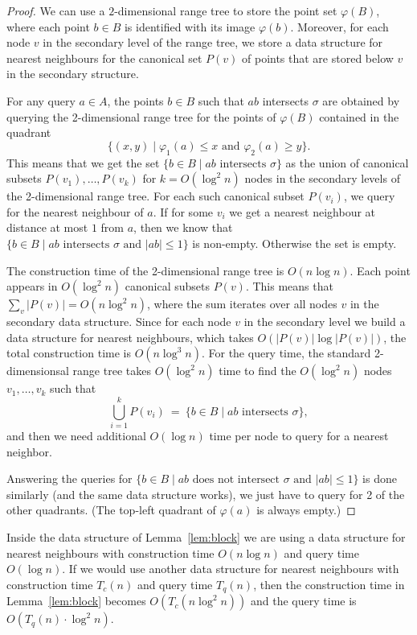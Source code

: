 \documentclass[a4paper,11pt]{article}
\let\le\leqslant
\let\ge\geqslant
\begin{document}
\begin{proof}
	We can use a $2$-dimensional range tree to store the point set $\varphi(B)$,
	where each point $b\in B$ is identified with its image $\varphi(b)$. 
	Moreover, for each node $v$ in the secondary level of the range tree, we 
	store a data structure for nearest neighbours for the canonical set $P(v)$ of points
	that are stored below $v$ in the secondary structure.
	
	For any query $a\in A$, the points $b\in B$ such that $ab$ intersects
	$\sigma$ are obtained by querying the 2-dimensional range tree for the points
	of $\varphi(B)$ contained in the quadrant 
	\[
		\{(x,y)\mid  \varphi_1(a) \le x \text{ and } \varphi_2(a) \ge y\}.
	\]
	This means that we get the set
	$\{ b\in B \mid \text{$ab$ intersects $\sigma$}\}$
	as the union of canonical subsets 
	$P(v_1),\dots,P(v_k)$ for $k=O(\log^2 n)$ nodes in the secondary levels
	of the 2-dimensional range tree.
	For each such canonical subset $P(v_i)$, we query for the nearest neighbour of $a$.
	If for some $v_i$ we get a nearest neighbour at distance at most $1$ from $a$,
	then we know that $\{ b\in B \mid \text{$ab$ intersects $\sigma$ and $|ab|\le 1$}\}$
	is non-empty. Otherwise the set is empty.

	The construction time of the 2-dimensional range tree is $O(n\log n)$.
	Each point appears in $O(\log^2 n)$ canonical subsets $P(v)$.
	This means that $\sum_v |P(v)| = O( n\log^2 n)$, where the sum iterates over
	all nodes $v$ in the secondary data structure.
	Since for each node $v$ in the secondary level we build a data structure for
	nearest neighbours, which takes $O(|P(v)| \log |P(v)|)$,
	the total construction time is $O( n\log^3 n)$.
	For the query time, the standard 2-dimensionsal range tree takes
	$O(\log^2 n)$ time to find the $O(\log^2 n)$  nodes $v_1,\dots, v_k$ such
	that 
	\[
		\bigcup_{i=1}^k P(v_i) ~=~ \{ b\in B \mid \text{$ab$ intersects $\sigma$}\},
	\]
	and then we need additional $O(\log n)$ time per node to query for a nearest neighbor.

	Answering the queries for 
	$\{ b\in B \mid \text{$ab$ does not intersect $\sigma$ and $|ab|\le 1$}\}$
	is done similarly (and the same data structure works), we just have
	to query for 2 of the other quadrants. 
	(The top-left quadrant of $\varphi(a)$ is always empty.)
\end{proof}

Inside the data structure of Lemma~\ref{lem:block} we are using a data structure
for nearest neighbours with construction time $O(n\log n)$ and query time $O(\log n)$.
If we would use another data structure for nearest neighbours with construction
time $T_c(n)$ and query time $T_q(n)$, then the construction time 
in Lemma~\ref{lem:block} becomes $O(T_c(n\log^2 n))$ and the query time is
$O(T_q(n)\cdot \log^2 n)$.
\end{document}
